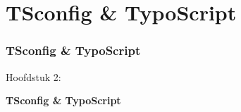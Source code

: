 %

\section{TSconfig \& TypoScript}
\begin{frame}[fragile]
	\frametitle{TSconfig \& TypoScript}

	\begin{center}\huge{Hoofdstuk 2:}\end{center}
	\begin{center}\huge{\color{typo3darkgrey}\textbf{TSconfig \& TypoScript}}\end{center}

\end{frame}


